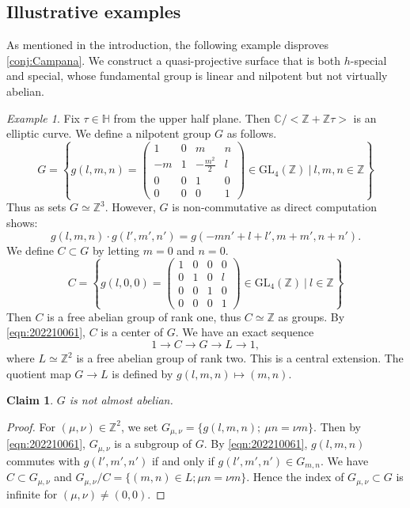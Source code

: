 \documentclass[11pt,english]{smfart}
\theoremstyle{plain}
\newtheorem{claim}[thm]{Claim}
\theoremstyle{definition}
\theoremstyle{remark}
\newtheorem{example}[thm]{Example}
\numberwithin{equation}{subsection}
\theoremstyle{plain}
\begin{document}
\subsection{Illustrative examples}\label{sec:examples} 
As mentioned in the introduction, the following example disproves \cref{conj:Campana}. 
We construct a quasi-projective surface that is both $h$-special and special, whose fundamental group is linear and nilpotent but not virtually abelian. 
 \begin{example}\label{example} 
	Fix $\tau\in\mathbb H$ from the upper half plane.
	Then $\mathbb C/<\mathbb Z+\mathbb Z\tau>$ is an elliptic curve.
	We define a nilpotent group $G$ as follows.
	$$
	G=\left\{g(l,m,n)=\begin{pmatrix}
		1 & 0 & m & n \\
		-m & 1 & -\frac{m^2}{2} & l \\
		0 & 0 & 1 & 0 \\
		0 & 0 & 0 & 1
	\end{pmatrix}
	\in\mathrm{GL}_4(\mathbb Z)
	\
	\vert 
	\
	l,m,n\in \mathbb Z
	\right\}
	$$
	Thus as sets $G\simeq \mathbb Z^3$.
	However, $G$ is non-commutative as direct computation shows:
	\begin{equation}\label{eqn:202210061}
		g(l,m,n)\cdot g(l',m',n')=g(-mn'+l+l',m+m',n+n').
	\end{equation}
	We define $C\subset G$ by letting $m=0$ and $n=0$.
	$$
	C=\left\{
	g(l,0,0)=
	\begin{pmatrix}
		1 & 0 & 0 & 0 \\
		0 & 1 & 0 & l \\
		0 & 0 & 1 & 0\\
		0 & 0 & 0 & 1
	\end{pmatrix}
	\in\mathrm{GL}_4(\mathbb Z)
	\
	\vert 
	\
	l\in \mathbb Z
	\right\}
	$$
	Then $C$ is a free abelian group of rank one, thus $C\simeq \mathbb Z$ as groups.
	By \eqref{eqn:202210061}, $C$ is a center of $G$.  
	We have an exact sequence
	$$
	1\to C\to G\to L\to 1,
	$$
	where $L\simeq \mathbb Z^2$ is a free abelian group of rank two.
	This is a central extension.
	The quotient map $G\to L$ is defined by $g(l,m,n)\mapsto (m,n)$.
	
	\begin{claim}
		$G$ is not almost abelian.
	\end{claim}
	
	\begin{proof}
		For $(\mu,\nu)\in\mathbb Z^2$, we set $G_{\mu,\nu}=\{ g(l,m,n);\ \mu n=\nu m\}$.
		Then by \eqref{eqn:202210061}, $G_{\mu,\nu}$ is a subgroup of $G$.
		By \eqref{eqn:202210061}, $g(l,m,n)$ commutes with $g(l',m',n')$ if and only if $g(l',m',n')\in G_{m,n}$.
		We have $C\subset G_{\mu,\nu}$ and $G_{\mu,\nu}/C=\{ (m,n)\in L; \mu n=\nu m\}$.
		Hence the index of $G_{\mu,\nu}\subset G$ is infinite for $(\mu,\nu)\not=(0,0)$. 
		

\end{proof}
\end{example}
\end{document}
